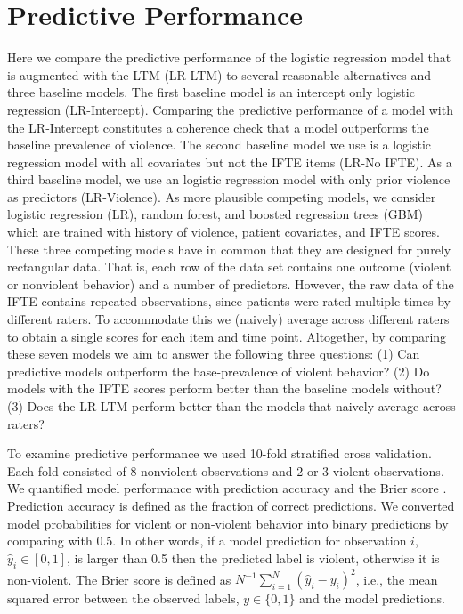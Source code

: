 \documentclass[a4paper,11pt]{article}
\begin{document}
\section{Predictive Performance}

Here we compare the predictive performance of the logistic regression model that is augmented with the LTM (LR-LTM) to several reasonable alternatives and three baseline models.
The first baseline model is an intercept only logistic regression (LR-Intercept). 
Comparing the predictive performance of a model with the LR-Intercept constitutes a coherence check that a model outperforms the baseline prevalence of violence.
The second baseline model we use is a logistic regression model with all covariates but not the IFTE items (LR-No IFTE).
As a third baseline model, we use an logistic regression model with only prior violence as predictors (LR-Violence).
As more plausible competing models, we consider logistic regression (LR), random forest, and boosted regression trees (GBM) which are trained with history of violence, patient covariates, and IFTE scores.
These three competing models have in common that they are designed for purely rectangular data.
That is, each row of the data set contains one outcome (violent or nonviolent behavior) and a number of predictors.
However, the raw data of the IFTE contains repeated observations, since patients were rated multiple times by different raters.
To accommodate this we (naively) average across different raters to obtain a single scores for each item and time point.
Altogether, by comparing these seven models we aim to answer the following three questions: (1) Can predictive models outperform the base-prevalence of violent behavior? (2) Do models with the IFTE scores perform better than the baseline models without? (3) Does the LR-LTM perform better than the models that naively average across raters?

To examine predictive performance we used 10-fold stratified cross validation.
Each fold consisted of 8 nonviolent observations and 2 or 3 violent observations.
We quantified model performance with prediction accuracy and the Brier score \parencite{brier1950verification}.
Prediction accuracy is defined as the fraction of correct predictions.
We converted model probabilities for violent or non-violent behavior into binary predictions by comparing with 0.5.
In other words, if a model prediction for observation $i$, $\hat{y}_i\in [0, 1]$, is larger than 0.5 then the predicted label is violent, otherwise it is non-violent.
The Brier score is defined as $N^{-1}\sum_{i=1}^N\left(\hat{y}_i-y_{i}\right)^2$, i.e., the mean squared error between the observed labels, $y\in\{0,1\}$ and the model predictions.
\end{document}
